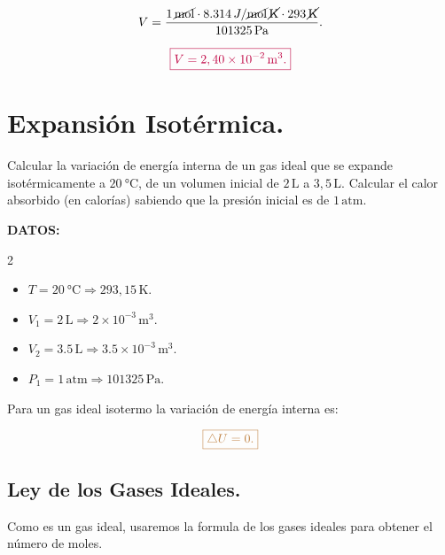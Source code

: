 \documentclass[a4paper,12pt]{article} %
\begin{document}
\[ V = \frac{1 \, \cancel{\mathrm{mol}} \cdot 8.314 \, J/ \cancel{\mathrm{mol}} \, \cancel{\mathrm{K}} \cdot 293 \, \cancel{\mathrm{K}}}{101325 \, \mathrm{Pa}}. \]

\vspace{\baselineskip}

\[ \textcolor{purple}{\boxed{ V = 2,40 \times 10^{-2} \, \mathrm{m}^3. }} \]

\section{Expansión Isotérmica.}

\begin{justify}
	Calcular la variación de energía interna de un gas ideal que se expande isotérmicamente a \( \SI{20}{\degreeCelsius} \), de un volumen inicial de \( 2 \, \mathrm{L} \) a \( 3,5 \, \mathrm{L} \). Calcular el calor absorbido (en calorías) sabiendo que la presión inicial es de \( 1 \, \mathrm{atm} \).
\end{justify}

\begin{justify}
	\textbf{DATOS:}
\end{justify}

\begin{multicols}{2}
	\begin{itemize}
		\item \( T = \SI{20}{\degreeCelsius} \Rightarrow 293,15 \, \mathrm{K}. \)
		\item \( V_1 = 2 \, \mathrm{L} \Rightarrow 2 \times 10^{-3} \, \mathrm{m}^3. \)
		\item \( V_2 = 3.5 \, \mathrm{L} \Rightarrow 3.5 \times 10^{-3} \, \mathrm{m}^3. \)
		\item \( P_1 = 1 \, \mathrm{atm} \Rightarrow 101325 \, \mathrm{Pa}. \) 
	\end{itemize}
\end{multicols}

\begin{justify}
	Para un gas ideal isotermo la variación de energía interna es:
\end{justify}

\[ \textcolor{brown}{\boxed{ \triangle U = 0. }} \]

\subsection{Ley de los Gases Ideales.}

\begin{justify}
	Como es un gas ideal, usaremos la formula de los gases ideales para obtener el número de moles.
\end{justify}
\end{document}
